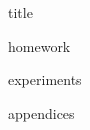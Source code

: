 \documentclass[11pt,titlepage]{report}
\begin{document}
{title}

\clearpage
\tableofcontents

\clearpage
{}
{homework}

{experiments}

\clearpage
{}
\printbibliography[heading=bibintoc]

\clearpage
{}
{appendices}
\end{document}
